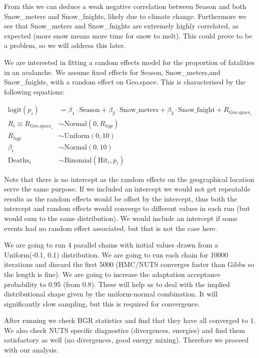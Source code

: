 \documentclass[10pt]{extarticle}
\begin{document}
From this we can deduce a weak negative correlation between Season and both Snow\_meters and Snow\_fnights, likely due to climate change. Furthermore we see that Snow\_meters and Snow\_fnights are extremely highly correlated, as expected (more snow means more time for snow to melt). This could prove to be a problem, so we will address this later. 

We are interested in fitting a random effects model for the proportion of fatalities in an avalanche. We assume fixed effects for Season, Snow\_meters,and Snow\_fnights, with a random effect on Geo.space. This is characterised by the following equations:

\begin{align*}
\mathrm{logit}(p_i) &= \beta_1 \cdot \mathrm{Season} + \beta_2 \cdot \mathrm{Snow\_meters} + \beta_3 \cdot \mathrm{Snow\_fnight} + R_{\mathrm{Geo.space}_i}\\
R_i \equiv R_{\mathrm{Geo.space}_i} &\sim \mathrm{Normal}(0, R_{hyp})\\
R_{hyp} &\sim \mathrm{Uniform}(0, 10)\\
\beta_i &\sim \mathrm{Normal}(0, 10)\\
\mathrm{Deaths}_i &\sim \mathrm{Binomial}(\mathrm{Hit}_i, p_i)
\end{align*}

Note that there is no intercept as the random effects on the geographical location serve the same purpose. If we included an intercept we would not get repeatable results as the random effects would be offset by the intercept, thus both the intercept and random effects would converge to different values in each run (but would sum to the same distribution). We would include an intercept if some events had no random effect associated, but that is not the case here.

We are going to run $4$ parallel chains with initial values drawn from a Uniform(-0.1, 0.1) distribution. We are going to run each chain for 10000 iterations and discard the first 5000 (HMC/NUTS converges faster than Gibbs so the length is fine). We are going to increase the adaptation acceptance probability to 0.95 (from 0.8). These will help us to deal with the implied distributional shape given by the uniform-normal combination. It will significantly slow sampling, but this is required for convergence.

After running we check BGR statistics and find that they have all converged to 1. We also check NUTS specific diagnostics (divergences, energies) and find them satisfactory as well (no divergences, good energy mixing). Therefore we proceed with our analysis.
\end{document}
